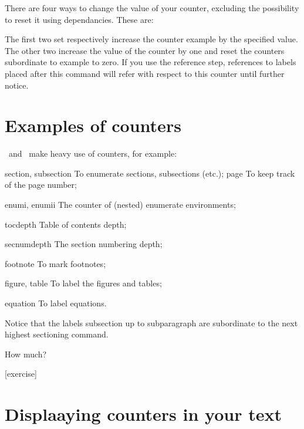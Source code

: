 There are four ways to change the value of your counter, excluding
the possibility to reset it using dependancies. These are:

\begin{teX}
\setcounter{example}{<value>}
\addtocounter{example}{<value>}
\end{teX}

The first two set respectively increase the counter example by the
specified value. The other two increase the value of the counter by
one and reset the counters subordinate to example to zero. If you
use the reference step, references to labels placed after this
command will refer with respect to this counter until further notice.

\section{Examples of counters}

\tex\ and \latex\ make heavy use of counters, for example:

\begin{description}
\item{section, subsection} To enumerate sections, subsections (etc.);
page To keep track of the page number;
\item{enumi, enumii} The counter of (nested) enumerate environments;
\item{tocdepth} Table of contents depth;
\item{secnumdepth} The section numbering depth;
\item{footnote} To mark footnotes;
\item{figure, table} To label the figures and tables;
\item{equation} To label equations.
\end{description}

Notice that the labels subsection up to subparagraph are
subordinate to the next highest sectioning command.

How much?

\begin{teX}
[exercise]
\setcounter{subex}{-2}
\addtocounter{subex}{2}
\addtocounter{exercise}{1}
\label{test}
\end{teX}

\section{Displaaying counters in your text}

